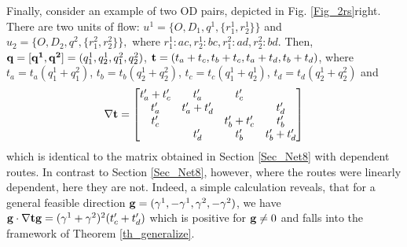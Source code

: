 \documentclass[a4paper,11pt]{article}
\begin{document}
Finally, consider an example of two OD pairs, depicted in Fig. \ref{Fig_2rs}right. 
There are two units of flow:
$u^1 = \{O, D_1, q^1, \{r^1_1,r^1_2\}\}$ and $u_2 = \{O, D_2, q^2, \{r^2_1, r^2_2\}\},$ where $r^1_1: ac, r^1_2: bc, r^2_1:ad, r^2_2:bd$. Then, $\bold{q} = [\bold{q^1}, \bold{q^2}] = ({q^1_1}, {q^1_2}, {q^2_1}, {q^2_2})$,  $\bold{t} = (t_a + t_c, t_b + t_c, t_a+t_d, t_b+t_d)$,
where $t_a = t_a(q^1_1 + q^2_1)$, $t_b = t_b(q^1_2 + q^2_2)$, $t_c=t_c(q^1_1 + q^1_2)$, $t_d = t_d(q^1_2 + q^2_2)$ and 
\begin{equation*}
\bold{\nabla t} = \begin{bmatrix}
t_a' + t_c' & t_a' & t_c' & \\
t_a' & t_a' + t_d' & & t_d' \\
t_c' & & t_b' + t_c' & t_b' \\
& t_d' & t_b' & t_b' + t_d'
\end{bmatrix}
\end{equation*}
which is identical to the matrix obtained in Section \ref{Sec_Net8} with dependent routes. In contrast to Section \ref{Sec_Net8}, however, where the routes were linearly dependent, here they are not. Indeed, a simple calculation reveals, that for a general feasible direction $\bold{g} = (\gamma^1, - \gamma^1, \gamma^2, -\gamma^2)$, we have $\bold{g} \cdot \bold{\nabla t} \bold{g} = (\gamma^1 + \gamma^2)^2 (t_c' + t_d')$ which is positive for $\bold{g} \neq 0$ and falls into the framework of Theorem \ref{th_generalize}.
\end{document}
